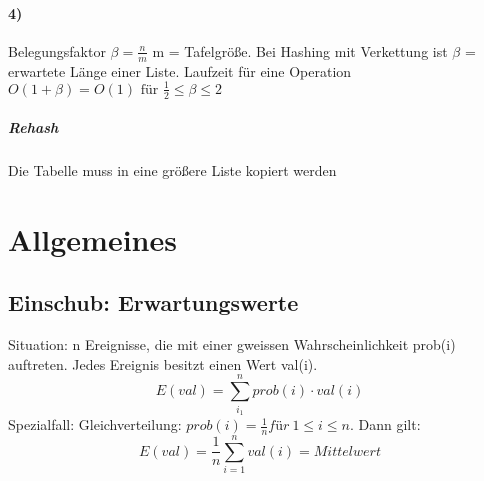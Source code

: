 \paragraph{4)} Belegungsfaktor $ \beta = \frac{n}{m} $ m = Tafelgröße. Bei Hashing mit Verkettung ist $ \beta $ = erwartete Länge einer Liste. Laufzeit für eine Operation $ O(1+\beta) = O(1) \text{ für } \frac{1}{2} \leq \beta \leq 2$ 
\subparagraph{Rehash} Die Tabelle muss in eine größere Liste kopiert werden \\
\begin{algorithm}[H]

\end{algorithm}








\section{Allgemeines}
\subsection{Einschub: Erwartungswerte}
Situation: n Ereignisse, die mit einer gweissen Wahrscheinlichkeit prob(i) auftreten. Jedes Ereignis besitzt einen Wert val(i). 
$$E(val) = \sum_{i_1}^{n} prob(i)\cdot val(i) $$
Spezialfall: Gleichverteilung: $ prob(i)=\frac{1}{n} für\ 1\leq i \leq n $. Dann gilt:
$$ E(val)= \frac{1}{n} \sum_{i=1}^{n}val(i) = Mittelwert $$
